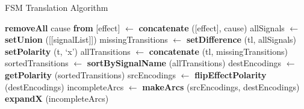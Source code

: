 \begin{algorithm}[ht]
\begin{algorithmic}
	\caption{FSM Translation Algorithm\label{alg:fsm}}
		\State \textbf{removeAll} cause \textbf{from} [effect]
		\State [signalList] $\leftarrow$ \textbf{concatenate} ([effect], cause)
	\EndFor
	\State allSignals $\leftarrow$ \textbf{setUnion} ([[signalList]])
		\State missingTransitions $\leftarrow$ \textbf{setDifference} (tl, allSignals)
			\State \textbf{setPolarity} (t, `x')
		\EndFor
		\State allTransitions $\leftarrow$ \textbf{concatenate} (tl, missingTransitions)
		\State sortedTransitions $\leftarrow$ \textbf{sortBySignalName} (allTransitions)
		\State destEncodings $\leftarrow$ \textbf{getPolarity} (sortedTransitions)
		\State srcEncodings $\leftarrow$ \textbf{flipEffectPolarity} (destEncodings)
		\State incompleteArcs $\leftarrow$ \textbf{makeArcs} (srcEncodings, destEncodings)
		\State \textbf{expandX} (incompleteArcs)
	\EndFor
\end{algorithmic}
\end{algorithm}
